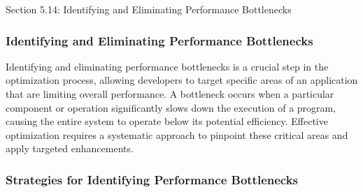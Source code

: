 \begin{notes}{Section 5.14: Identifying and Eliminating Performance Bottlenecks}
    \subsubsection*{Identifying and Eliminating Performance Bottlenecks}

    Identifying and eliminating performance bottlenecks is a crucial step in the optimization process, allowing developers to target specific areas of an application that are limiting overall performance. 
    A bottleneck occurs when a particular component or operation significantly slows down the execution of a program, causing the entire system to operate below its potential efficiency. Effective 
    optimization requires a systematic approach to pinpoint these critical areas and apply targeted enhancements. \vspace*{1em}
    
    \subsubsection*{Strategies for Identifying Performance Bottlenecks}
    

\end{notes}
